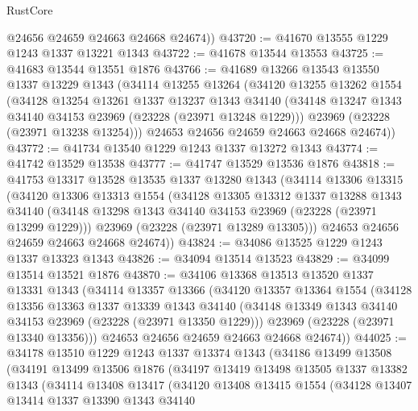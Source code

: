 \begin{lexlean}{RustCore}
\begin{coremodule}
        @24656
        @24659
        @24663
        @24668
        @24674))
@43720 := @41670 @13555 @1229 @1243 @1337 @13221 @1343
@43722 := @41678 @13544 @13553
@43725 := @41683 @13544 @13551 @1876
@43766 := @41689
    @13266
    @13543
    @13550
    @1337
    @13229
    @1343
    (@34114
      @13255
      @13264
      (@34120
        @13255
        @13262
        @1554
        (@34128
          @13254
          @13261
          @1337
          @13237
          @1343
          @34140
          (@34148 @13247 @1343 @34140 @34153 @23969 (@23228 (@23971 @13248 @1229)))
          @23969
          (@23228 (@23971 @13238 @13254)))
        @24653
        @24656
        @24659
        @24663
        @24668
        @24674))
@43772 := @41734 @13540 @1229 @1243 @1337 @13272 @1343
@43774 := @41742 @13529 @13538
@43777 := @41747 @13529 @13536 @1876
@43818 := @41753
    @13317
    @13528
    @13535
    @1337
    @13280
    @1343
    (@34114
      @13306
      @13315
      (@34120
        @13306
        @13313
        @1554
        (@34128
          @13305
          @13312
          @1337
          @13288
          @1343
          @34140
          (@34148 @13298 @1343 @34140 @34153 @23969 (@23228 (@23971 @13299 @1229)))
          @23969
          (@23228 (@23971 @13289 @13305)))
        @24653
        @24656
        @24659
        @24663
        @24668
        @24674))
@43824 := @34086 @13525 @1229 @1243 @1337 @13323 @1343
@43826 := @34094 @13514 @13523
@43829 := @34099 @13514 @13521 @1876
@43870 := @34106
    @13368
    @13513
    @13520
    @1337
    @13331
    @1343
    (@34114
      @13357
      @13366
      (@34120
        @13357
        @13364
        @1554
        (@34128
          @13356
          @13363
          @1337
          @13339
          @1343
          @34140
          (@34148 @13349 @1343 @34140 @34153 @23969 (@23228 (@23971 @13350 @1229)))
          @23969
          (@23228 (@23971 @13340 @13356)))
        @24653
        @24656
        @24659
        @24663
        @24668
        @24674))
@44025 := @34178
    @13510
    @1229
    @1243
    @1337
    @13374
    @1343
    (@34186
      @13499
      @13508
      (@34191
        @13499
        @13506
        @1876
        (@34197
          @13419
          @13498
          @13505
          @1337
          @13382
          @1343
          (@34114
            @13408
            @13417
            (@34120
              @13408
              @13415
              @1554
              (@34128
                @13407
                @13414
                @1337
                @13390
                @1343
                @34140

\end{coremodule}
\end{lexlean}
